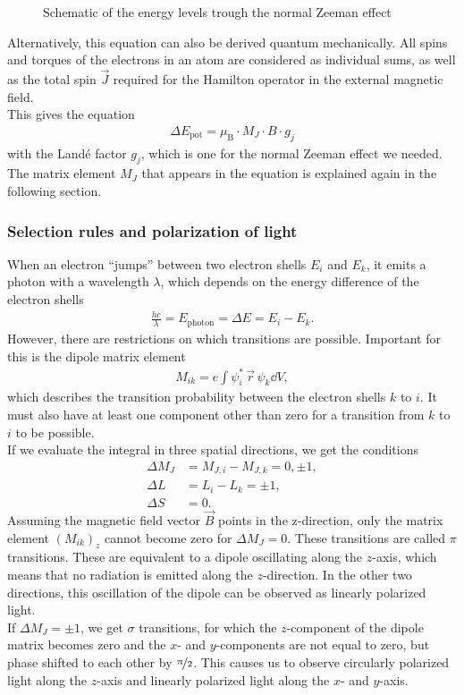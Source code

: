 \begin{figure}[ht]
\centering

\caption{Schematic of the energy levels trough the normal Zeeman effect}
\label{fig:splitting}
\end{figure}

Alternatively, this equation can also be derived quantum mechanically.
All spins and torques of the electrons in an atom are considered as individual sums, as well as the total spin $\vec{J}$ required for the Hamilton operator in the external magnetic field.\\
This gives the equation
\begin{align}
\Delta E_\text{pot} = \mu_\text{B} \cdot M_J \cdot B \cdot g_j
\end{align}
with the Landé factor $g_j$, which is one for the normal Zeeman effect we needed.
The matrix element $M_J$ that appears in the equation is explained again in the following section.

\subsubsection{Selection rules and polarization of light}
When an electron \enquote{jumps} between two electron shells $E_i$ and $E_k$, it emits a photon with a wavelength $\lambda$, which depends on the energy difference of the electron shells
\begin{align}
\frac{hc}{\lambda} = E_\text{photon} = \Delta E = E_i - E_k.
\end{align}
However, there are restrictions on which transitions are possible.
Important for this is the dipole matrix element
\begin{align}
M_{ik} = e \int \psi_i^* \, \vec{r} \, \psi_k \dd{V},
\end{align}
which describes the transition probability between the electron shells $k$ to $i$.
It must also have at least one component other than zero for a transition from $k$ to $i$ to be possible.\\
If we evaluate the integral in three spatial directions, we get the conditions
\begin{align}
\Delta M_J &= M_{J,i} - M_{J,k} = 0, \pm 1,\\
\Delta L &= L_i - L_k = \pm 1,\\
\Delta S &= 0.
\end{align}
Assuming the magnetic field vector $\vec{B}$ points in the z-direction, only the matrix element $(M_{ik})_z$ cannot become zero for $\Delta M_J = 0$.
These transitions are called $\pi$ transitions.
These are equivalent to a dipole oscillating along the $z$-axis, which means that no radiation is emitted along the $z$-direction. In the other two directions, this oscillation of the dipole can be observed as linearly polarized light.\\
If $\Delta M_J = \pm 1$, we get $\sigma$ transitions, for which the $z$-component of the dipole matrix becomes zero and the $x$- and $y$-components are not equal to zero, but phase shifted to each other by $\nicefrac{\pi}{2}$.
This causes us to observe circularly polarized light along the $z$-axis and linearly polarized light along the $x$- and $y$-axis.\\


